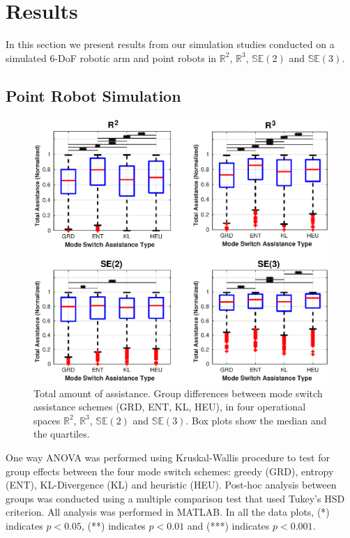 \documentclass[letterpaper, 10 pt, conference]{ieeeconf}  %
\begin{document}
\section{Results}\label{sec:results}

In this section we present results from our simulation studies conducted on a simulated 6-DoF robotic arm and point robots in $\mathbb{R}^2$, $\mathbb{R}^3$, $\mathbb{SE}(2)$ and $\mathbb{SE}(3)$. 
\subsection{Point Robot Simulation}
\begin{figure}[t]
	\centering
	\includegraphics[width= 1.1\hsize, height=1\vsize, center]{./figures/total_assistance.eps}
	\vspace{-0.8cm}
	\caption{Total amount of assistance. Group differences between mode switch assistance schemes (GRD, ENT, KL, HEU), in four operational spaces $\mathbb{R}^2$, $\mathbb{R}^3$, $\mathbb{SE}(2)$ and $\mathbb{SE}(3)$. Box plots show the median and the quartiles.} 
	\label{fig:total_assistance}
\end{figure}
One way ANOVA was performed using Kruskal-Wallis procedure to test for group effects between the four mode switch schemes: greedy (GRD), entropy (ENT), KL-Divergence (KL) and heuristic (HEU). Post-hoc analysis between groups was conducted using a multiple comparison test that used Tukey's HSD criterion. All analysis was performed in MATLAB. In all the data plots, (*) indicates $p < 0.05$, (**) indicates $p < 0.01$ and (***) indicates $p < 0.001$.
\end{document}

